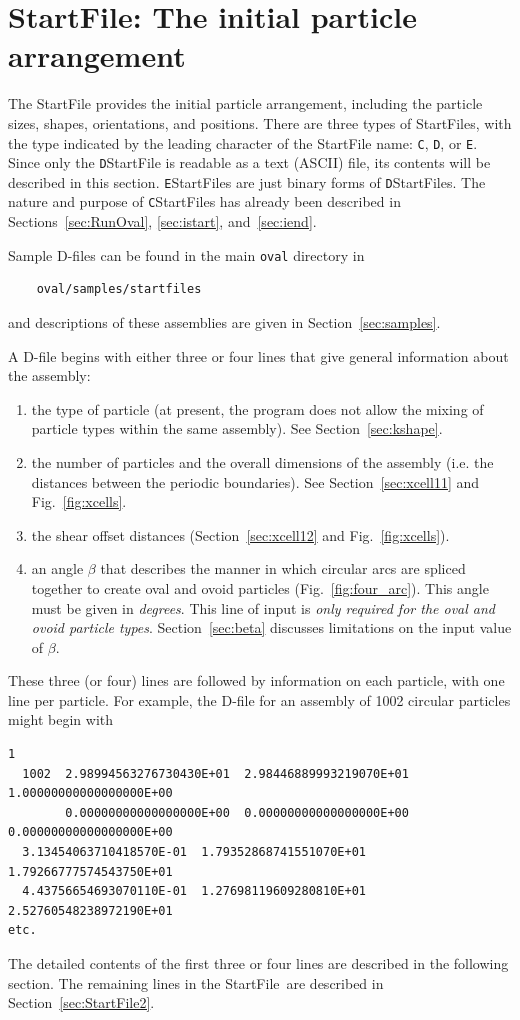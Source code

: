 \documentclass[letterpaper,11pt]{article}
\newcommand{\StartFile}{\textsf{StartFile}}
\begin{document}
\section{\textsf{StartFile}: The initial particle arrangement}%
\label{sec:startfileD}
The \textsf{StartFile} provides the initial particle arrangement,
including the
particle sizes, shapes, orientations, and positions.
There are three types of \textsf{StartFiles}, with the type indicated by
the leading character of the \textsf{StartFile} name:
\texttt{C}, \texttt{D}, or \texttt{E}.
Since only the \texttt{D}\textsf{StartFile} is readable as a
text (ASCII) file, its contents will be described in this section.
\texttt{E}\textsf{StartFile}s are 
just binary forms of \texttt{D}\textsf{StartFile}s.
The nature and
purpose of \texttt{C}\textsf{StartFile}s has already been described in
Sections~\ref{sec:RunOval}, \ref{sec:istart}, and~\ref{sec:iend}.
\par
Sample D-files can be found in the main \texttt{oval} directory
in 
\begin{verbatim}
    oval/samples/startfiles
\end{verbatim}
and descriptions of these assemblies
are given in Section~\ref{sec:samples}.
\par
A D-file begins with either three or four lines that give general
information about the assembly:
\begin{enumerate}
\item
the type of particle (at present, the program does not allow the mixing
of particle types within the same assembly).
See Section~\ref{sec:kshape}.
\item
the number of particles and the overall dimensions of the assembly
(i.e. the distances between the periodic boundaries).
See Section~\ref{sec:xcell11} and Fig.~\ref{fig:xcells}.
\item
the shear offset distances (Section~\ref{sec:xcell12} 
and Fig.~\ref{fig:xcells}).
\item
an angle $\beta$ that describes the manner in which circular arcs are spliced
together to create oval and ovoid particles (Fig.~\ref{fig:four_arc}).  
This angle must be given in \emph{degrees}.
This line of input is 
\emph{only required for the oval and ovoid particle types}.
Section~\ref{sec:beta} discusses limitations on the input value of $\beta$.
\end{enumerate}
These three (or four) lines are followed by information on each particle,
with one line per particle. 
For example, the D-file for an assembly of 1002 circular particles
might begin with
\par
\footnotesize
\label{page:dfile}
\begin{verbatim}
1
  1002  2.98994563276730430E+01  2.98446889993219070E+01  1.00000000000000000E+00
        0.00000000000000000E+00  0.00000000000000000E+00  0.00000000000000000E+00
  3.13454063710418570E-01  1.79352868741551070E+01  1.79266777574543750E+01
  4.43756654693070110E-01  1.27698119609280810E+01  2.52760548238972190E+01
etc.
\end{verbatim}
\normalsize
\par
The detailed contents of the first three or four lines are described in
the following section.  The remaining lines in the \StartFile\ are 
described in Section~\ref{sec:StartFile2}.
%
\end{document}
